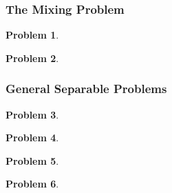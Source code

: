 \documentclass{article}
\newtheorem{problem}{Problem}
\begin{document}
\subsubsection{The Mixing Problem}
\begin{problem}

\end{problem}


\begin{problem}

\end{problem}

\subsubsection{General Separable Problems}
\begin{problem}

\end{problem}


\begin{problem}

\end{problem}
\begin{problem}

\end{problem}


\begin{problem}

\end{problem}

\end{document}
